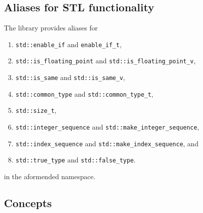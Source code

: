 \documentclass[oneside]{book}
\begin{document}
\subsection{Aliases for STL functionality}
The library provides aliases for
\begin{enumerate}
	\item \texttt{std::enable\_if} and \texttt{enable\_if\_t},
	\item \texttt{std::is\_floating\_point} and \texttt{std::is\_floating\_point\_v},
	\item \texttt{std::is\_same} and \texttt{std::is\_same\_v},
	\item \texttt{std::common\_type} and \texttt{std::common\_type\_t},
	\item \texttt{std::size\_t},
	\item \texttt{std::integer\_sequence} and \texttt{std::make\_integer\_sequence},
	\item \texttt{std::index\_sequence} and \texttt{std::make\_index\_sequence}, and
	\item \texttt{std::true\_type} and \texttt{std::false\_type}.
\end{enumerate}
in the aformended namespace.

\subsection{Concepts}



\end{document}
